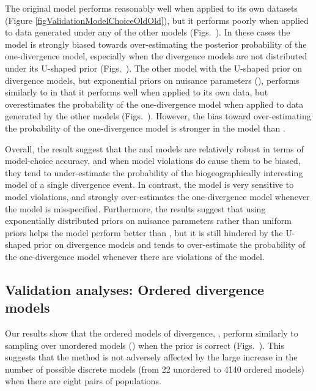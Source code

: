 The original \msb model \modelOld performs reasonably well when applied
to its own datasets (Figure \ref{figValidationModelChoiceOldOld}), but
it performs poorly when applied to data generated under any of the other
models (Figs.\
).
In these cases the \modelOld model is strongly biased towards over-estimating
the posterior probability of the one-divergence model, especially when the
divergence models are not distributed under its U-shaped prior (Figs.\
).
The other model with the U-shaped prior on divergence models, but exponential
priors on nuisance parameters (\modelUshaped), performs similarly to \modelOld
in that it performs well when applied to its own data, but overestimates
the probability of the one-divergence model when applied to data generated
by the other models (Figs.\
).
However, the bias toward over-estimating the probability of the one-divergence
model is stronger in the \modelOld model than \modelUshaped.

Overall, the result suggest that the \modelDPP and \modelUniform models are
relatively robust in terms of model-choice accuracy, and when model violations
do cause them to be biased, they tend to under-estimate the probability of
the biogeographically interesting model of a single divergence event.
In contrast, the \modelOld model is very sensitive to model violations,
and strongly over-estimates the one-divergence model whenever the model
is misspecified.
Furthermore, the results suggest that using exponentially distributed priors on
nuisance parameters rather than uniform priors helps the \modelUshaped model
perform better than \modelOld, but it is still hindered by the U-shaped prior
on divergence models and tends to over-estimate the probability of the
one-divergence model whenever there are violations of the model.


\subsection*{Validation analyses: Ordered divergence models}
Our results show that the ordered models of divergence, \modelDPPOrdered,
perform similarly to sampling over unordered models (\modelDPP) when the prior
is correct (Figs.\
).
This suggests that the method is not adversely affected by the large increase
in the number of possible discrete models (from 22 unordered to 4140 ordered
models) when there are eight pairs of populations.

